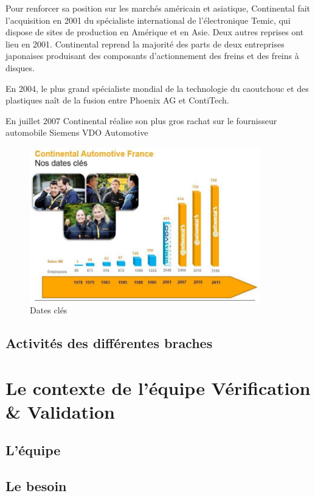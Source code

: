 		Pour renforcer sa position sur les marchés américain et asiatique, Continental fait l'acquisition en 2001 du spécialiste international de l'électronique Temic, qui dispose de sites de production en Amérique et en Asie. Deux autres reprises ont lieu en 2001. Continental reprend la majorité des parts de deux entreprises japonaises produisant des composants d'actionnement des freins et des freins à disques.

		En 2004, le plus grand spécialiste mondial de la technologie du caoutchouc et des plastiques naît de la fusion entre Phoenix AG et ContiTech.

		En juillet 2007 Continental réalise son plus gros rachat sur le fournisseur automobile Siemens VDO Automotive

		\begin{figure}[H]
			\centering
			\includegraphics[width=10cm]{contents/images/datesCles.jpg}
			\caption{Dates clés}
			\label{fig:datesCles}
		\end{figure}
		\subsection{Activités des différentes braches}
	\section{Le contexte de l'équipe Vérification \& Validation}
		\subsection{L'équipe}
		\subsection{Le besoin}
